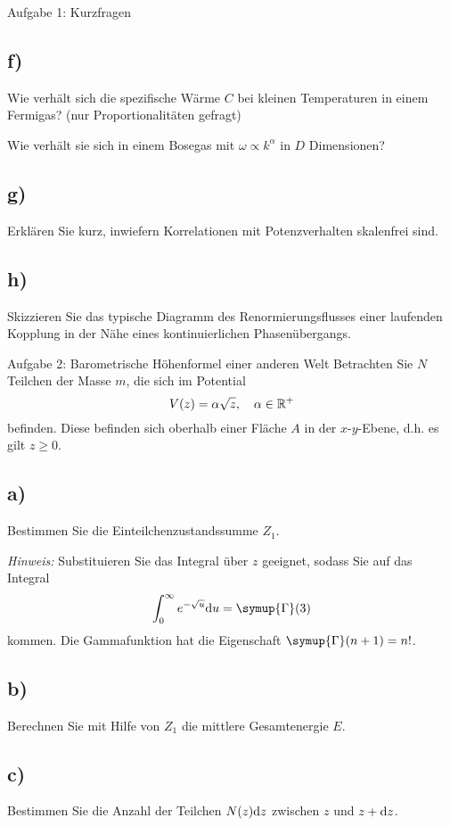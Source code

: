 \begin{aufgabe}{Aufgabe 1: Kurzfragen}
\subsection{f)}
Wie verhält sich die spezifische Wärme $C$ bei kleinen Temperaturen in einem Fermigas? (nur Proportionalitäten gefragt)

Wie verhält sie sich in einem Bosegas mit $\omega \propto k^\alpha$ in $D$ Dimensionen?

\subsection{g)}
Erklären Sie kurz, inwiefern Korrelationen mit Potenzverhalten skalenfrei sind.

\subsection{h)}
Skizzieren Sie das typische Diagramm des Renormierungsflusses einer laufenden Kopplung in der Nähe eines kontinuierlichen Phasenübergangs.
\end{aufgabe}

\begin{aufgabe}{Aufgabe 2: Barometrische Höhenformel einer anderen Welt}
Betrachten Sie $N$ Teilchen der Masse $m$, die sich im Potential
\[
    V(z) = \alpha \sqrt{z}, \quad \alpha \in \mathbb{R}^+
\]
befinden.
Diese befinden sich oberhalb einer Fläche $A$ in der $x$-$y$-Ebene, d.h. es gilt $z \geq 0$.

\subsection{a)}
Bestimmen Sie die Einteilchenzustandssumme $Z_1$.

\textit{Hinweis:} Substituieren Sie das Integral über $z$ geeignet, sodass Sie auf das Integral
\[
    \int_0^\infty{e^{-\sqrt{u}} \d u} = \symup{\Gamma}(3)
\]
kommen. Die Gammafunktion hat die Eigenschaft $\symup{\Gamma}(n+1) = n!$.

\subsection{b)}
Berechnen Sie mit Hilfe von $Z_1$ die mittlere Gesamtenergie $E$.

\subsection{c)}
Bestimmen Sie die Anzahl der Teilchen $N(z) \mathrm{d} z$ zwischen $z$ und $z + \mathrm{d} z$.

\end{aufgabe}

